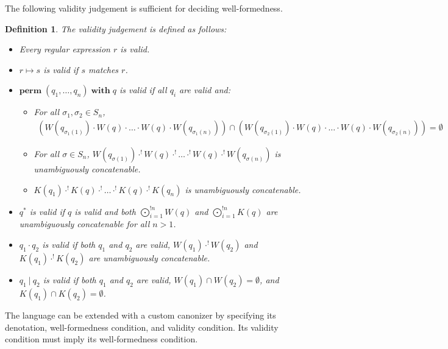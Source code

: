 \documentclass[a4paper,11pt] {article}
\theoremstyle{plain}
\newtheorem{definition}[theorem]{Definition}
\newcommand{\perm}{ \textbf{perm}\; }
\newcommand{\with}{ \;\textbf{with}\; }
\begin{document}
The following validity judgement
is sufficient for deciding well-formedness.
\begin{definition}
  The validity judgement is defined as follows:
  \begin{itemize}
  \item Every regular expression $r$ is valid.
  \item $r \mapsto s$ is valid if $s$ matches $r$.
  \item $\perm(q_1, \ldots, q_n) \with q$ is valid if all $q_i$ are
    valid and:
    \begin{itemize}
    \item For all $\sigma_1, \sigma_2 \in S_n$,
      \begin{align*}
        (W(q_{\sigma_1(1)}) \cdot W(q) \cdot \ldots
        \cdot W(q) \cdot W(q_{\sigma_1(n)})) \cap
        (W(q_{\sigma_2(1)}) \cdot W(q) \cdot \ldots
        \cdot W(q) \cdot W(q_{\sigma_2(n)})) = \emptyset
      \end{align*}
    \item For all $\sigma \in S_n$,
      $W(q_{\sigma(1)}) \cdot^! W(q) \cdot^!
      \ldots \cdot^! W(q) \cdot^! W(q_{\sigma(n)})$
      is unambiguously concatenable.
    \item $K(q_1) \cdot^! K(q) \cdot^! \ldots
    \cdot^! K(q) \cdot^! K(q_n)$ is unambiguously
    concatenable.
    \end{itemize}
  \item $q^*$ is valid if $q$ is valid and both
    $\bigodot_{i=1}^{!n} W(q)$ and $\bigodot_{i=1}^{!n} K(q)$ are
    unambiguously concatenable for all $n > 1$.
  \item $q_1 \cdot q_2$ is valid if both $q_1$ and $q_2$ are valid,
    $W(q_1) \cdot^{!} W(q_2)$ and $K(q_1) \cdot^{!} K(q_2)$ are unambiguously
    concatenable.
  \item $q_1 ~|~ q_2$ is valid if both $q_1$ and $q_2$ are valid,
    $W(q_1) \cap W(q_2) = \emptyset$, and $K(q_1) \cap K(q_2) = \emptyset$.
  \end{itemize}

\end{definition}
The language can be extended with a custom canonizer by specifying its
denotation, well-formedness condition, and validity condition. Its
validity condition must imply its well-formedness condition.
\end{document}
